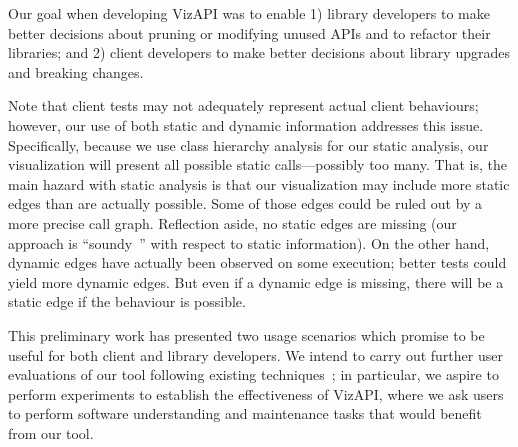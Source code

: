 \label{sec:discussion}
Our goal when developing VizAPI was to enable 1) library developers to make better
decisions about pruning or modifying unused APIs and to refactor their
libraries; and 2) client developers to make better decisions about library
upgrades and breaking changes.


Note that client tests may
not adequately represent actual client behaviours; however, our use of both static
and dynamic information addresses this issue. Specifically, because we use
class hierarchy analysis for our static analysis, our visualization will present
all possible static calls---possibly too many. 
That is, the main hazard with static analysis is that our visualization may include more
static edges than are actually possible. Some of those edges could be ruled out by a more
precise call graph. Reflection aside, no static edges
are missing (our approach is ``soundy~\cite{livshits15:_in_defen_sound}'' with respect to static information). On the other hand, dynamic edges have actually been observed
on some execution; better tests could yield more dynamic edges. But even if
a dynamic edge is missing, there will be a static edge if the behaviour is possible.

This preliminary work has presented two usage scenarios which promise to be useful for both client and library
developers. We intend to carry out further user evaluations of our tool following
existing techniques~\cite{merino18:_system_liter_review_softw_visual_evaluat}; in
particular, we aspire to perform experiments to establish the
effectiveness of VizAPI, where we ask users to perform software
understanding and maintenance tasks that would benefit from our tool.


